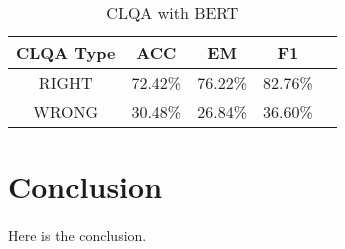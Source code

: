 \documentclass{article}
\begin{document}
\begin{table}[ht!]
  \centering
  \caption{CLQA with BERT}
  \begin{tabular}{ccccc}
    CLQA Type & ACC & EM & F1\\
    \toprule
    RIGHT & 72.42\% & 76.22\% & 82.76\% \\
    WRONG & 30.48\% & 26.84\% & 36.60\% \\
  \end{tabular}
  \label{tab:bert-clqa-right-wrong}
\end{table}

\section{Conclusion}
\paragraph{}
Here is the conclusion.



\end{document}
